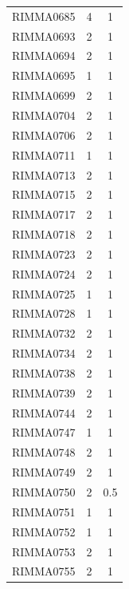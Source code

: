 \documentclass[11pt]{article}
\newcounter{rowno}
\begin{document}
\begin{scriptsize}
\begin{longtable}{>{\stepcounter{rowno}}ccc}
    RIMMA0685 & 4     & 1 \\
    RIMMA0693 & 2     & 1 \\
    RIMMA0694 & 2     & 1 \\
    RIMMA0695 & 1     & 1 \\
    RIMMA0699 & 2     & 1 \\
    RIMMA0704 & 2     & 1 \\
    RIMMA0706 & 2     & 1 \\
    RIMMA0711 & 1     & 1 \\
    RIMMA0713 & 2     & 1 \\
    RIMMA0715 & 2     & 1 \\
    RIMMA0717 & 2     & 1 \\
    RIMMA0718 & 2     & 1 \\
    RIMMA0723 & 2     & 1 \\
    RIMMA0724 & 2     & 1 \\
    RIMMA0725 & 1     & 1 \\
    RIMMA0728 & 1     & 1 \\
    RIMMA0732 & 2     & 1 \\
    RIMMA0734 & 2     & 1 \\
    RIMMA0738 & 2     & 1 \\
    RIMMA0739 & 2     & 1 \\
    RIMMA0744 & 2     & 1 \\
    RIMMA0747 & 1     & 1 \\
    RIMMA0748 & 2     & 1 \\
    RIMMA0749 & 2     & 1 \\
    RIMMA0750 & 2     & 0.5 \\
    RIMMA0751 & 1     & 1 \\
    RIMMA0752 & 1     & 1 \\
    RIMMA0753 & 2     & 1 \\
    RIMMA0755 & 2     & 1 \\
    \hline
\end{longtable}
\end{scriptsize}

\clearpage

\end{document}
